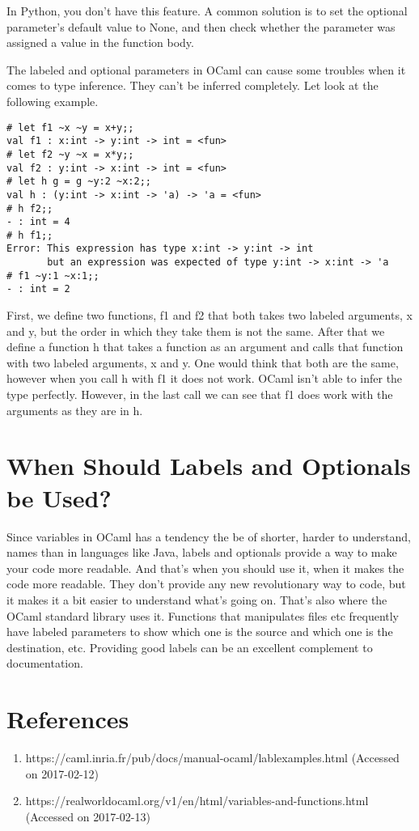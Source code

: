 \documentclass{article}
\begin{document}
In Python, you don't have this feature.
A common solution is to set the optional parameter's default value to None, and then check whether the parameter was assigned a value in the function body.

The labeled and optional parameters in OCaml can cause some troubles when it comes to type inference.
They can't be inferred completely.
Let look at the following example.

\begin{verbatim}
# let f1 ~x ~y = x+y;;
val f1 : x:int -> y:int -> int = <fun>
# let f2 ~y ~x = x*y;;
val f2 : y:int -> x:int -> int = <fun>
# let h g = g ~y:2 ~x:2;;
val h : (y:int -> x:int -> 'a) -> 'a = <fun>
# h f2;;
- : int = 4
# h f1;;
Error: This expression has type x:int -> y:int -> int
       but an expression was expected of type y:int -> x:int -> 'a
# f1 ~y:1 ~x:1;;
- : int = 2
\end{verbatim}

First, we define two functions, f1 and f2 that both takes two labeled arguments, x and y, but the order in which they take them is not the same.
After that we define a function h that takes a function as an argument and calls that function with two labeled arguments, x and y.
One would think that both are the same, however when you call h with f1 it does not work.
OCaml isn't able to infer the type perfectly.
However, in the last call we can see that f1 does work with the arguments as they are in h.

\section{When Should Labels and Optionals be Used?}

Since variables in OCaml has a tendency the be of shorter, harder to understand, names than in languages like Java, labels and optionals provide a way to make your code more readable.
And that's when you should use it, when it makes the code more readable.
They don't provide any new revolutionary way to code, but it makes it a bit easier to understand what's going on.
That's also where the OCaml standard library uses it.
Functions that manipulates files etc frequently have labeled parameters to show which one is the source and which one is the destination, etc.
Providing good labels can be an excellent complement to documentation.

\section{References}
\begin{enumerate}
    \item https://caml.inria.fr/pub/docs/manual-ocaml/lablexamples.html (Accessed on 2017-02-12)
    \item https://realworldocaml.org/v1/en/html/variables-and-functions.html (Accessed on 2017-02-13)
\end{enumerate}
\end{document}
